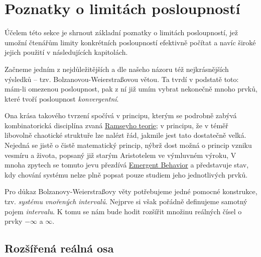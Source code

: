 \section{Poznatky o limitách posloupností}
\label{sec:poznatky-o-limitach-posloupnosti}

Účelem této sekce je shrnout základní poznatky o limitách posloupností, jež
umožní čtenářům limity konkrétních posloupností efektivně počítat a navíc
široké jejich použití v následujících kapitolách.

Začneme jedním z nejdůležitějších a dle našeho názoru též nejkrásnějších
výsledků -- tzv. Bolzano\-vou-Weierstraßovou větou. Ta tvrdí v podstatě toto:
mám-li omezenou posloupnost, pak z ní již umím vybrat nekonečně mnoho prvků,
které tvoří posloupnost \emph{konvergentní}.

Ona krása takového tvrzení spočívá v principu, kterým se podrobně zabývá
kombinatorická disciplína zvaná
\href{https://en.wikipedia.org/wiki/Ramsey_theory}{Ramseyho teorie}; v principu,
že v téměř libovolně chaotické struktuře lze nalézt řád, jakmile jest tato
dostatečně velká. Nejedná se jistě o čistě matematický princip, nýbrž dost možná
o princip vzniku vesmíru a života, popsaný již starým Aristotelem ve výmluvném
výroku,  V mnoha zpytech se tomuto
jevu přezdívá
\href{https://www.sciencedirect.com/topics/computer-science/emergent-behavior}{Emergent
Behavior} a představuje stav, kdy chování systému nelze plně popsat pouze
studiem jeho jednotlivých prvků.

Pro důkaz Bolzanovy-Weierstraßovy věty potřebujeme jedné pomocné konstrukce,
tzv. \emph{systému vnořených intervalů}. Nejprve si však pořádně definujeme
samotný pojem \emph{intervalu}. K tomu se nám bude hodit rozšířit množinu
reálných čísel o prvky $-\infty$ a $\infty$.

\subsection{Rozšířená reálná osa}
\label{ssec:rozsirena-realna-osa}

